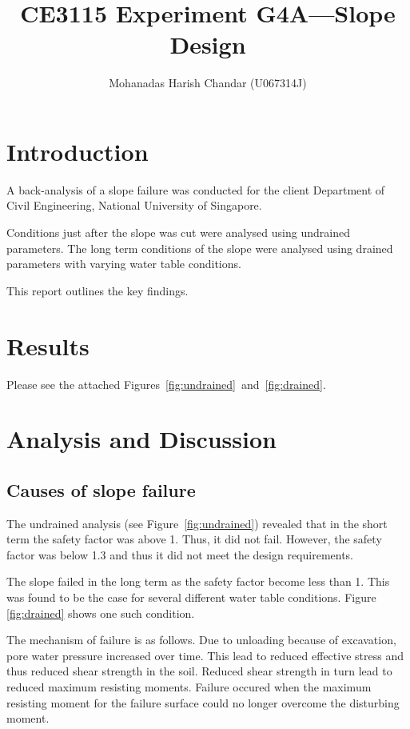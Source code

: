 \documentclass[a4paper]{article}
\title{CE3115 Experiment G4A---Slope Design}
\author{Mohanadas Harish Chandar (U067314J)}
\begin{document}
\maketitle


\section{Introduction}

A back-analysis of a slope failure was conducted for the client Department of Civil Engineering, National University of Singapore. 

Conditions just after the slope was cut were analysed using undrained parameters. The long term conditions of the slope were analysed using drained parameters with varying water table conditions.

This report outlines the key findings.


\section{Results}
Please see the attached Figures~\ref{fig:undrained}~and~\ref{fig:drained}.


\section{Analysis and Discussion}

\subsection{Causes of slope failure}
The undrained analysis (see Figure~\ref{fig:undrained}) revealed that in the short term the safety factor was above 1. Thus, it did not fail. However, the safety factor was below 1.3 and thus it did not meet the design requirements. 

The slope failed in the long term as the safety factor become less than 1. 
This was found to be the case for several different water table 
conditions. Figure \ref{fig:drained} shows one such condition.

The mechanism of failure is as follows.
Due to unloading because of excavation, pore water pressure increased 
over time. This lead to reduced effective stress and thus reduced shear 
strength in the soil. 
Reduced shear strength in turn lead to reduced maximum resisting moments.
Failure occured when the maximum resisting moment for the failure surface
could no longer overcome the disturbing moment.
\end{document}
